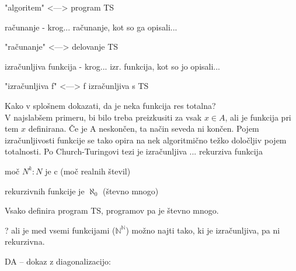 \documentclass[10pt,a4paper,oneside]{book}
\begin{document}
"algoritem" <---> program TS%


računanje%
\fixme - krog... računanje, kot so ga opisali...%

"računanje" <---> delovanje TS%


izračunljiva funkcija%
\fixme - krog... izr. funkcija, kot so jo opisali...%

"izračunljiva f" <---> f izračunljiva s TS%


Kako v splošnem dokazati, da je neka funkcija res totalna?\\
V najslabšem primeru, bi bilo treba preizkusiti za vsak $x\in A$, ali je funkcija pri tem $x$ definirana.%
Če je A neskončen, ta način seveda ni končen.
Pojem izračunljivosti funkcije se tako opira na nek algoritmično težko določljiv pojem totalnosti.
\br
Po Church-Turingovi tezi je izračunljiva ... rekurziva funkcija %
\begin{items}
\item moč $N^k:N$ je c (moč realnih števil)%
\item rekurzivnih funkcije je $\aleph_0$ (števno mnogo)
\item Vsako definira program TS, programov pa je števno mnogo.
\item ? ali je med vsemi funkcijami ($\mathbb{N}^\mathbb{N}$) možno najti tako, ki je izračunljiva, pa ni rekurzivna.
\item DA -- dokaz z diagonalizacijo:\\
\end{items}
\end{document}
